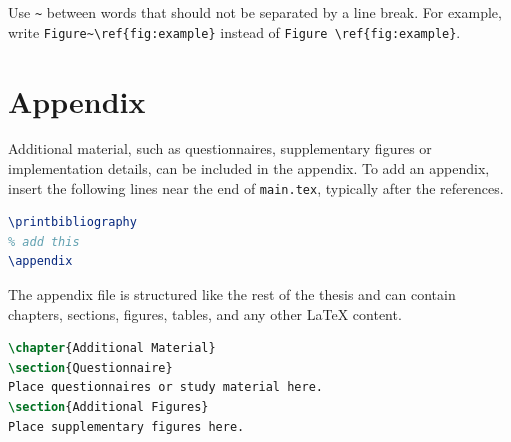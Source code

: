 Use \texttt{\textasciitilde} between words that should not be separated by a line break. For example, write \texttt{Figure\textasciitilde\textbackslash ref\{fig:example\}} instead of \texttt{Figure \textbackslash ref\{fig:example\}}.


\section{Appendix}


Additional material, such as questionnaires, supplementary figures or implementation details, can be included in the appendix. To add an appendix, insert the following lines near the end of \texttt{main.tex}, typically after the references.

\begin{lstlisting}[language=TeX,caption={Including an appendix}]
\printbibliography
% add this
\appendix

\end{lstlisting}

The appendix file is structured like the rest of the thesis and can contain chapters, sections, figures, tables, and any other \LaTeX{} content.

\begin{lstlisting}[language=TeX,caption={Example appendix file}]
\chapter{Additional Material}
\section{Questionnaire}
Place questionnaires or study material here.
\section{Additional Figures}
Place supplementary figures here.
\end{lstlisting}

